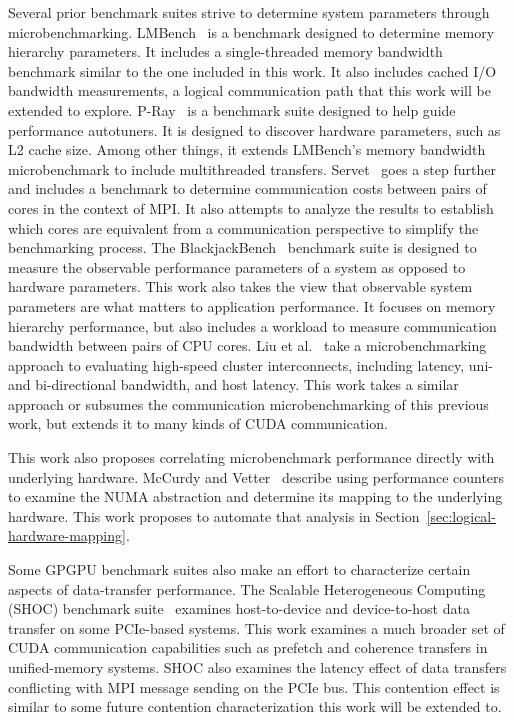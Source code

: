Several prior benchmark suites strive to determine system parameters through microbenchmarking.
LMBench~\cite{mcvoy1996lmbench} is a benchmark designed to determine memory hierarchy parameters.
It includes a single-threaded memory bandwidth benchmark similar to the one included in this work.
It also includes cached I/O bandwidth measurements, a logical communication path that this work will be extended to explore.
P-Ray~\cite{duchateau2008p} is a benchmark suite designed to help guide performance autotuners.
It is designed to discover hardware parameters, such as L2 cache size.
Among other things, it extends LMBench's memory bandwidth microbenchmark to include multithreaded transfers.
Servet~\cite{gonzalez2010servet} goes a step further and includes a benchmark to determine communication costs between pairs of cores in the context of MPI.
It also attempts to analyze the results to establish which cores are equivalent from a communication perspective to simplify the benchmarking process.
The BlackjackBench~\cite{danalis2012blackjackbench} benchmark suite is designed to measure the observable performance parameters of a system as opposed to hardware parameters.
This work also takes the view that observable system parameters are what matters to application performance.
It focuses on memory hierarchy performance, but also includes a workload to measure communication bandwidth between pairs of CPU cores.
Liu et al.~\cite{liu2004microbenchmark} take a microbenchmarking approach to evaluating high-speed cluster interconnects, including latency, uni- and bi-directional bandwidth, and host latency.
This work takes a similar approach or subsumes the communication microbenchmarking of this previous work, but extends it to many kinds of CUDA communication.

This work also proposes correlating microbenchmark performance directly with underlying hardware.
McCurdy and Vetter~\cite{mccurdy2010memphis} describe using performance counters to examine the NUMA abstraction and determine its mapping to the underlying hardware.
This work proposes to automate that analysis in Section~\ref{sec:logical-hardware-mapping}.

Some GPGPU benchmark suites also make an effort to characterize certain aspects of data-transfer performance.
The Scalable Heterogeneous Computing (SHOC) benchmark suite~\cite{danalis2010scalable} examines host-to-device and device-to-host data transfer on some PCIe-based systems.
This work examines a much broader set of CUDA communication capabilities such as prefetch and coherence transfers in unified-memory systems.
SHOC also examines the latency effect of data transfers conflicting with MPI message sending on the PCIe bus.
This contention effect is similar to some future contention characterization this work will be extended to.

